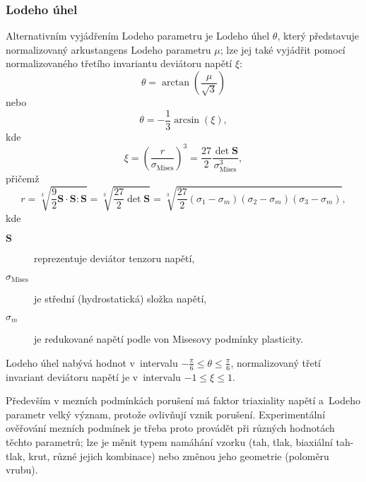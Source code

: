\subsubsection{Lodeho úhel}
Alternativním vyjádřením Lodeho parametru je Lodeho úhel $\theta$, který představuje normalizovaný arkustangens Lodeho parametru $\mu$; lze jej také vyjádřit pomocí normalizovaného třetího invariantu deviátoru napětí $\xi$:
\begin{equation}
	\theta = \arctan\left(\frac{\mu}{\sqrt{3}}\right)
\end{equation}
nebo
\begin{equation}
	\theta = -\frac{1}{3}\arcsin\left(\xi\right),
\end{equation}
kde
\begin{equation*}
	\xi = \left(\frac{r}{\sigma_\text{Mises}}\right)^3
	= \frac{27}{2} \frac{\det \bm{S}}{\sigma_\text{Mises}^3},
\end{equation*}
přičemž
\begin{equation*}
	r = \sqrt[3]{\frac{9}{2} \bm{S}\cdot\bm{S}\!:\!\bm{S}}
	= \sqrt[3]{\frac{27}{2} \det\bm{S}}
	= \sqrt[3]{\frac{27}{2} (\sigma_1-\sigma_m)(\sigma_2-\sigma_m)(\sigma_3-\sigma_m)},
\end{equation*}
kde
\begin{description}
	\item[$\bm{S}$] reprezentuje deviátor tenzoru napětí,
	\item[$\sigma_\text{Mises}$] je střední (hydrostatická) složka napětí,
	\item[$\sigma_m$] je redukované napětí podle von Misesovy podmínky plasticity.
\end{description}

Lodeho úhel nabývá hodnot v~intervalu $-\frac{\pi}{6} \leq \theta \leq \frac{\pi}{6}$, normalizovaný třetí invariant deviátoru napětí je v~intervalu $-1 \leq \xi \leq 1$. 

Především v mezních podmínkách porušení má faktor triaxiality napětí a~Lodeho parametr velký význam, protože ovlivňují vznik porušení. Experimentální ověřování mezních podmínek je třeba proto provádět při různých hodnotách těchto parametrů; lze je měnit typem namáhání vzorku (tah, tlak, biaxiální tah-tlak, krut, různé jejich kombinace) nebo změnou jeho geometrie (poloměru vrubu).